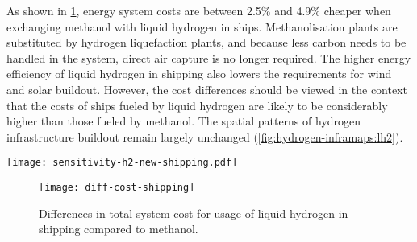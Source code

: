 As shown in \cref{fig:sensitivity-shipping-diff}, energy system costs are
between 2.5\% and 4.9\% cheaper when exchanging methanol with liquid hydrogen in
ships. Methanolisation plants are substituted by hydrogen liquefaction plants,
and because less carbon needs to be handled in the system, direct air capture is
no longer required. The higher energy efficiency of liquid hydrogen in shipping
also lowers the requirements for wind and solar buildout. However, the cost
differences should be viewed in the context that the costs of ships fueled by
liquid hydrogen are likely to be considerably higher than those fueled by
methanol. The spatial patterns of hydrogen
infrastructure buildout remain largely unchanged
(\cref{fig:hydrogen-inframaps:lh2}).

\begin{SCfigure}
    \centering
    \texttt{[image: sensitivity-h2-new-shipping.pdf]}
    \caption{Cost benefits of electricity and hydrogen network infrastructure with use of liquid hydrogen in shipping instead of methanol.}
    \label{fig:sensitivity-shipping}
\end{SCfigure}

\begin{figure}
    \centering
    \texttt{[image: diff-cost-shipping]}
    \caption{Differences in total system cost for usage of liquid hydrogen in shipping compared to methanol.}
    \label{fig:sensitivity-shipping-diff}
\end{figure}

